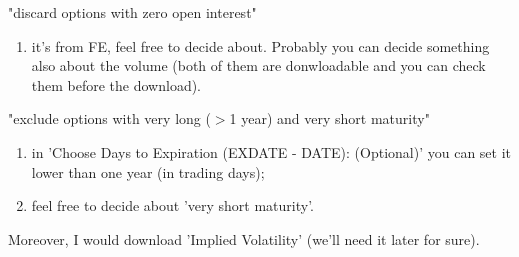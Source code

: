 \documentclass{article}
\begin{document}
"discard options with zero open interest"
\begin{enumerate}
    \item it's from FE, feel free to decide about. Probably you can decide something also about the volume (both of them are donwloadable and you can check them before the download).

\end{enumerate}
"exclude options with very long ($>$1 year) and very short maturity"
\begin{enumerate}
    \item in 'Choose Days to Expiration (EXDATE - DATE): (Optional)' you can set it lower than one year (in trading days);
    \item feel free to decide about 'very short maturity'.
\end{enumerate}
Moreover, I would download 'Implied Volatility' (we'll need it later for sure).
\end{document}
